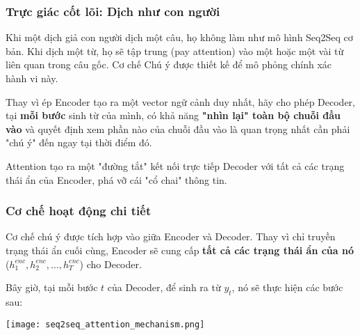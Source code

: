 \subsubsection{Trực giác cốt lõi: Dịch như con người}
Khi một dịch giả con người dịch một câu, họ không làm như mô hình Seq2Seq cơ bản. Khi dịch một từ, họ sẽ tập trung (pay attention) vào một hoặc một vài từ liên quan trong câu gốc. Cơ chế Chú ý được thiết kế để mô phỏng chính xác hành vi này.

\begin{tcolorbox}[
    title=Ý tưởng đột phá của Attention,
    colback=yellow!10!white, colframe=yellow!50!black, fonttitle=\bfseries
]
Thay vì ép Encoder tạo ra một vector ngữ cảnh duy nhất, hãy cho phép Decoder, tại \textbf{mỗi bước} sinh từ của mình, có khả năng \textbf{"nhìn lại" toàn bộ chuỗi đầu vào} và quyết định xem phần nào của chuỗi đầu vào là quan trọng nhất cần phải "chú ý" đến ngay tại thời điểm đó.
\end{tcolorbox}

Attention tạo ra một "đường tắt" kết nối trực tiếp Decoder với tất cả các trạng thái ẩn của Encoder, phá vỡ cái "cổ chai" thông tin.

\subsubsection{Cơ chế hoạt động chi tiết}
Cơ chế chú ý được tích hợp vào giữa Encoder và Decoder. Thay vì chỉ truyền trạng thái ẩn cuối cùng, Encoder sẽ cung cấp \textbf{tất cả các trạng thái ẩn của nó} ($h_1^{enc}, h_2^{enc}, \dots, h_T^{enc}$) cho Decoder.

Bây giờ, tại mỗi bước $t$ của Decoder, để sinh ra từ $y_t$, nó sẽ thực hiện các bước sau:

\begin{center}
    \texttt{[image: seq2seq\_attention\_mechanism.png]}
    \label{fig:seq2seq_attention_mechanism}
\end{center}

